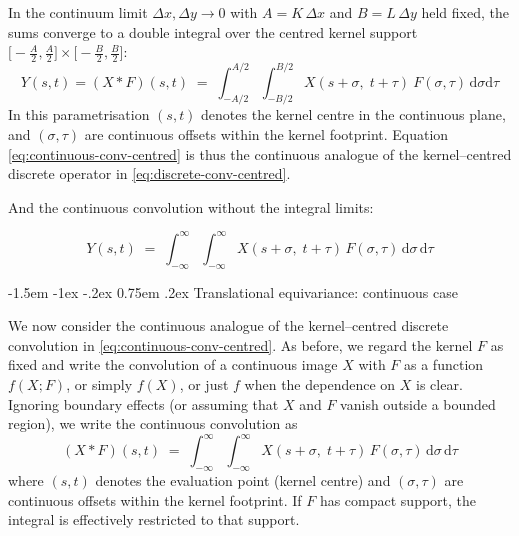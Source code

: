 \documentclass[12pt]{article}
\makeatletter
\renewcommand\subsection{\@startsection{subsection}{2}{\z@}%
                                     {-1.5em \@plus -1ex \@minus -.2ex}%
                                     {0.75em \@plus .2ex}%
                                     {\normalfont\large\bfseries}}
\makeatother
\begin{document}
  In the continuum limit $\Delta x,\Delta y \to 0$ with
  $A = K\,\Delta x$ and $B = L\,\Delta y$ held fixed, the sums converge
  to a double integral over the centred kernel support
  $\bigl[-\tfrac{A}{2},\tfrac{A}{2}\bigr] \times
   \bigl[-\tfrac{B}{2},\tfrac{B}{2}\bigr]$:
  \begin{equation}
    \label{eq:continuous-conv-centred}
    Y(s,t) = (X * F)(s,t)
    \;=\;
    \int_{-A/2}^{A/2}\!\!\int_{-B/2}^{B/2}
    X(s + \sigma,\; t + \tau)\
    F(\sigma,\tau)\,\mathrm{d}\sigma\mathrm{d}\tau
  \end{equation}
  In this parametrisation $(s,t)$ denotes the kernel centre in the
  continuous plane, and $(\sigma,\tau)$ are continuous offsets within the
  kernel footprint.  Equation \eqref{eq:continuous-conv-centred} is thus
  the continuous analogue of the kernel–centred discrete operator in
  \eqref{eq:discrete-conv-centred}.
  
And the continuous convolution without the integral limits:

\begin{equation}
  \label{eq:continuous-conv-centred-no-limits}
  Y(s,t)
  \;=\;
  \int_{-\infty}^{\infty} \!\! \int_{-\infty}^{\infty}
  X(s + \sigma,\; t + \tau)\,
  F(\sigma,\tau)\,\mathrm{d}\sigma\,\mathrm{d}\tau
\end{equation}



















  \subsection{Translational equivariance: continuous case}

  We now consider the continuous analogue of the kernel--centred discrete
  convolution in \eqref{eq:continuous-conv-centred}. As before, we regard the
  kernel $F$ as fixed and write the convolution of a continuous image $X$ with
  $F$ as a function $f(X; F)$, or simply $f(X)$, or just $f$ when the dependence
  on $X$ is clear. Ignoring boundary effects (or assuming that $X$ and $F$ vanish
  outside a bounded region), we write the continuous convolution as
  \begin{equation}
    \label{eq:continuous-conv-equiv}
    (X * F)(s,t)
    \;=\;
    \int_{-\infty}^{\infty}\!\!\int_{-\infty}^{\infty}
    X(s + \sigma,\; t + \tau)\,
    F(\sigma,\tau)\,\mathrm{d}\sigma\,\mathrm{d}\tau
  \end{equation}
  where $(s,t)$ denotes the evaluation point (kernel centre) and
  $(\sigma,\tau)$ are continuous offsets within the kernel footprint.  If $F$
  has compact support, the integral is effectively restricted to that support.
  
\end{document}
